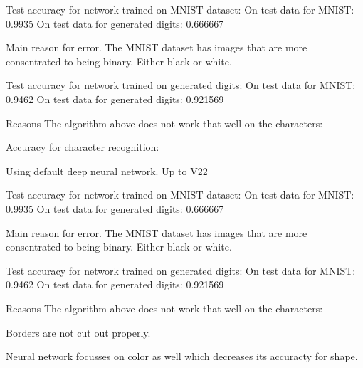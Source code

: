Test accuracy for network trained on MNIST dataset:
On test data for MNIST: 		0.9935
On test data for generated digits: 	0.666667

Main reason for error.
The MNIST dataset has images that are more consentrated to being binary.
Either black or white.

Test accuracy for network trained on generated digits:
On test data for MNIST:			 0.9462
On test data for generated digits:	 0.921569


Reasons The algorithm above does not work that well on the characters:

Accuracy for character recognition:

Using default deep neural network. Up to V22

Test accuracy for network trained on MNIST dataset:
On test data for MNIST: 		0.9935
On test data for generated digits: 	0.666667

Main reason for error.
The MNIST dataset has images that are more consentrated to being binary.
Either black or white.

Test accuracy for network trained on generated digits:
On test data for MNIST:			 0.9462
On test data for generated digits:	 0.921569


Reasons The algorithm above does not work that well on the characters:


Borders are not cut out properly.

Neural network focusses on color as well which decreases its accuracty for shape.
